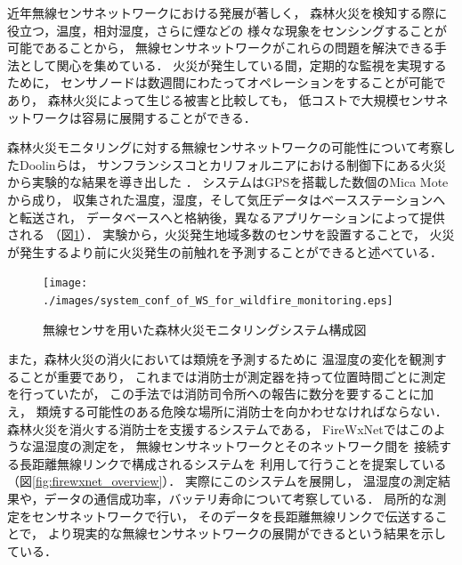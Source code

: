 近年無線センサネットワークにおける発展が著しく，
森林火災を検知する際に役立つ，温度，相対湿度，さらに煙などの
様々な現象をセンシングすることが可能であることから，
無線センサネットワークがこれらの問題を解決できる手法として関心を集めている．
火災が発生している間，定期的な監視を実現するために，
センサノードは数週間にわたってオペレーションをすることが可能であり，
森林火災によって生じる被害と比較しても，
低コストで大規模センサネットワークは容易に展開することができる．


森林火災モニタリングに対する無線センサネットワークの可能性について考察したDoolinらは，
サンフランシスコとカリフォルニアにおける制御下にある火災から実験的な結果を導き出した
\cite{doi:10.1117/12.605655}．
システムはGPSを搭載した数個のMica Moteから成り，
収集された温度，湿度，そして気圧データはベースステーションへと転送され，
データベースへと格納後，異なるアプリケーションによって提供される
（図\ref{fig:system_conf_of_WS_for_wildfire_monitoring}）．
実験から，火災発生地域多数のセンサを設置することで，
火災が発生するより前に火災発生の前触れを予測することができると述べている．

\begin{figure}[htbp]
 \begin{center}
  \texttt{[image: ./images/system\_conf\_of\_WS\_for\_wildfire\_monitoring.eps]}
 \end{center}
 \caption{無線センサを用いた森林火災モニタリングシステム構成図}
 \label{fig:system_conf_of_WS_for_wildfire_monitoring}
\end{figure}



また，森林火災の消火においては類焼を予測するために
温湿度の変化を観測することが重要であり，
これまでは消防士が測定器を持って位置時間ごとに測定を行っていたが，
この手法では消防司令所への報告に数分を要することに加え，
類焼する可能性のある危険な場所に消防士を向かわせなければならない．
森林火災を消火する消防士を支援するシステムである，
FireWxNet\cite{conf/mobisys/HartungHSH06}ではこのような温湿度の測定を，
無線センサネットワークとそのネットワーク間を
接続する長距離無線リンクで構成されるシステムを
利用して行うことを提案している（図\ref{fig:firewxnet_overview}）．
実際にこのシステムを展開し，
温湿度の測定結果や，データの通信成功率，バッテリ寿命について考察している．
局所的な測定をセンサネットワークで行い，
そのデータを長距離無線リンクで伝送することで，
より現実的な無線センサネットワークの展開ができるという結果を示している．

